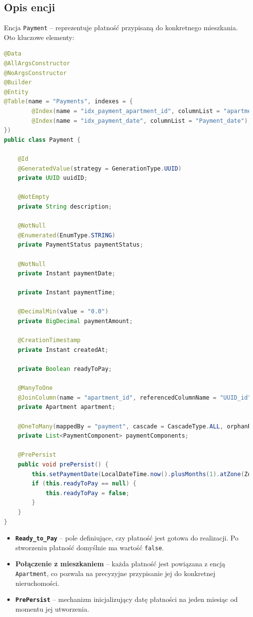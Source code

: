 \subsection{Opis encji}

Encja \texttt{Payment} -- reprezentuje płatność przypisaną do konkretnego mieszkania. Oto kluczowe elementy:

\begin{lstlisting}[language=Java, style=JavaStyle, caption=Kod encji \texttt{Payment}]
@Data
@AllArgsConstructor
@NoArgsConstructor
@Builder
@Entity
@Table(name = "Payments", indexes = {
        @Index(name = "idx_payment_apartment_id", columnList = "apartment_id"),
        @Index(name = "idx_payment_date", columnList = "Payment_date"),
})
public class Payment {

    @Id
    @GeneratedValue(strategy = GenerationType.UUID)
    private UUID uuidID;

    @NotEmpty
    private String description;

    @NotNull
    @Enumerated(EnumType.STRING)
    private PaymentStatus paymentStatus;

    @NotNull
    private Instant paymentDate;

    private Instant paymentTime;

    @DecimalMin(value = "0.0")
    private BigDecimal paymentAmount;

    @CreationTimestamp
    private Instant createdAt;

    private Boolean readyToPay;

    @ManyToOne
    @JoinColumn(name = "apartment_id", referencedColumnName = "UUID_id")
    private Apartment apartment;

    @OneToMany(mappedBy = "payment", cascade = CascadeType.ALL, orphanRemoval = true)
    private List<PaymentComponent> paymentComponents;

    @PrePersist
    public void prePersist() {
        this.setPaymentDate(LocalDateTime.now().plusMonths(1).atZone(ZoneId.systemDefault()).toInstant());
        if (this.readyToPay == null) {
            this.readyToPay = false;
        }
    }
}
\end{lstlisting}

\begin{itemize}
    \item \textbf{\texttt{Ready\_to\_Pay}} -- pole definiujące, czy płatność jest gotowa do realizacji. Po stworzeniu płatność domyślnie ma wartość \texttt{false}.
    \item \textbf{Połączenie z mieszkaniem} -- każda płatność jest powiązana z encją \texttt{Apartment}, co pozwala na precyzyjne przypisanie jej do konkretnej nieruchomości.
    \item \textbf{\texttt{PrePersist}} -- mechanizm inicjalizujący datę płatności na jeden miesiąc od momentu jej utworzenia.
\end{itemize}


